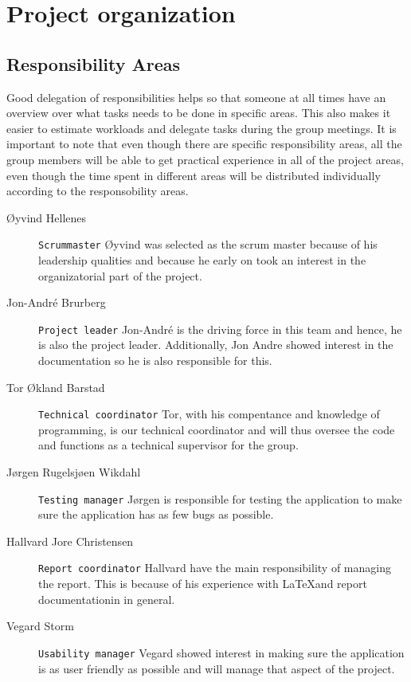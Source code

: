 \section{Project organization}
\thispagestyle{plain}
	\subsection{Responsibility Areas}

Good delegation of responsibilities helps so that someone at all times have an overview over what tasks needs to be done in specific areas. This also makes it easier to estimate workloads and delegate tasks during the group meetings. It is important to note that even though there are specific responsibility areas, all the group members will be able to get practical experience in all of the project areas, even though the time spent in different areas will be distributed individually according to the responsobility areas.

\begin{description}
\item[Øyvind Hellenes] \texttt{Scrummaster} \hspace{8pt} Øyvind was selected as the scrum master because of his leadership qualities and because he early on took an interest in the organizatorial part of the project.
\item[Jon-André Brurberg] \texttt{Project leader}\hspace{8pt} Jon-André is the driving force in this team and hence, he is also the project leader. Additionally, Jon Andre showed interest in the documentation so he is also responsible for this.
\item[Tor Økland Barstad] \texttt{Technical coordinator} \hspace{8pt}Tor, with his compentance and knowledge of programming, is our technical coordinator and will thus oversee the code and functions as a technical supervisor for the group.
\item[Jørgen Rugelsjøen Wikdahl] \texttt{Testing manager}\hspace{8pt} Jørgen is responsible for testing the application to make sure the application has as few bugs as possible.
\item[Hallvard Jore Christensen] \texttt{Report coordinator}  \hspace{8pt} Hallvard have the main responsibility of managing the report. This is because of his experience with \LaTeX and report documentationin in general.
\item[Vegard Storm] \texttt{Usability manager}\hspace{8pt} Vegard showed interest in making sure the application is as user friendly as possible and will manage that aspect of the project.
\end{description}
	
